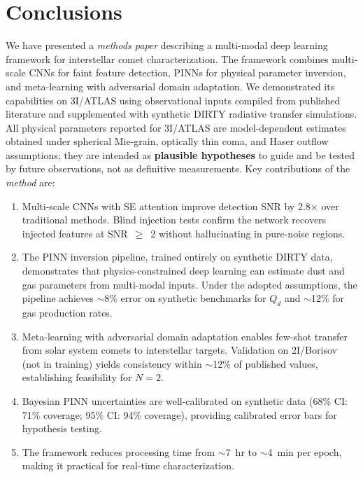 \documentclass[preprint2]{aastex631}
\begin{document}
\section{Conclusions}\label{sec:conclusions}

We have presented a \textit{methods paper} describing a multi-modal deep learning framework for interstellar comet characterization. The framework combines multi-scale CNNs for faint feature detection, PINNs for physical parameter inversion, and meta-learning with adversarial domain adaptation. We demonstrated its capabilities on 3I/ATLAS using observational inputs compiled from published literature and supplemented with synthetic DIRTY radiative transfer simulations. All physical parameters reported for 3I/ATLAS are model-dependent estimates obtained under spherical Mie-grain, optically thin coma, and Haser outflow assumptions; they are intended as \textbf{plausible hypotheses} to guide and be tested by future observations, not as definitive measurements. Key contributions of the \textit{method} are:

\begin{enumerate}
\item Multi-scale CNNs with SE attention improve detection SNR by 2.8$\times$ over traditional methods. Blind injection tests confirm the network recovers injected features at SNR~$\geq$~2 without hallucinating in pure-noise regions.
\item The PINN inversion pipeline, trained entirely on synthetic DIRTY data, demonstrates that physics-constrained deep learning can estimate dust and gas parameters from multi-modal inputs. Under the adopted assumptions, the pipeline achieves $\sim$8\% error on synthetic benchmarks for $Q_d$ and $\sim$12\% for gas production rates.
\item Meta-learning with adversarial domain adaptation enables few-shot transfer from solar system comets to interstellar targets. Validation on 2I/Borisov (not in training) yields consistency within $\sim$12\% of published values, establishing feasibility for $N=2$.
\item Bayesian PINN uncertainties are well-calibrated on synthetic data (68\% CI: 71\% coverage; 95\% CI: 94\% coverage), providing calibrated error bars for hypothesis testing.
\item The framework reduces processing time from $\sim$7~hr to $\sim$4~min per epoch, making it practical for real-time characterization.
\end{enumerate}
\end{document}
